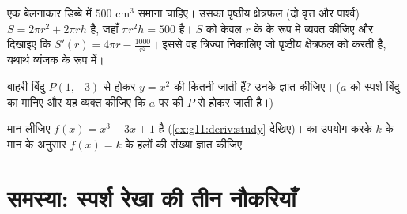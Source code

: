 \begin{exercise}[$\star\star$]\label{exo:g11:deriv:10}
एक बेलनाकार डिब्बे में $500$ cm$^3$ समाना चाहिए। उसका पृष्ठीय क्षेत्रफल (दो
वृत्त और पार्श्व) $S = 2\pi r^2 + 2\pi r h$ है, जहाँ $\pi r^2 h = 500$ है। $S$ को केवल $r$ के  के
रूप में व्यक्त कीजिए और दिखाइए कि $S'(r) = 4\pi r -
\frac{1000}{r^2}$। इससे वह त्रिज्या निकालिए जो
पृष्ठीय क्षेत्रफल को  करती है, यथार्थ व्यंजक के रूप में।
\end{exercise}

\begin{exercise}[$\star\star\star$]\label{exo:g11:deriv:11}
बाहरी बिंदु $P(1, -3)$ से होकर  $y = x^2$ की कितनी  जाती हैं? उनके
 ज्ञात कीजिए। ($a$ को स्पर्श बिंदु का  मानिए और यह व्यक्त कीजिए
कि $a$ पर की  $P$ से होकर जाती है।)
\end{exercise}

\begin{exercise}[$\star\star\star$]\label{exo:g11:deriv:12}
मान लीजिए $f(x) = x^3 - 3x + 1$ है (\cref{ex:g11:deriv:study} देखिए)।  का उपयोग करके  $k$ के मान के अनुसार  $f(x) = k$ के हलों की संख्या ज्ञात कीजिए।
\end{exercise}

\section{समस्या: स्पर्श रेखा की तीन नौकरियाँ}


